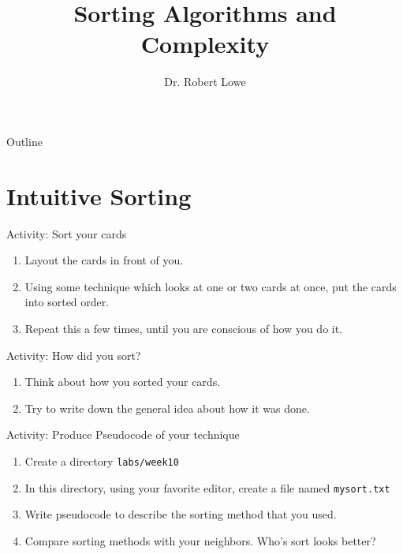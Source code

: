 \documentclass[]{beamer}
\title{Sorting Algorithms and Complexity}
\author{Dr. Robert Lowe\\}
\institute[Maryville College] %
{
  Division of Mathematics and Computer Science\\
  Maryville College
}
\date[]{}
\begin{document}
\begin{frame}
  \titlepage
\end{frame}

\begin{frame}{Outline}
  \tableofcontents
\end{frame}





\section{Intuitive Sorting}
\begin{frame}{Activity: Sort your cards}
\begin{enumerate}
    \item Layout the cards in front of you.
    \item Using some technique which looks at one or two cards at
        once, put the cards into sorted order.
    \item Repeat this a few times, until you are conscious of how you
        do it.
\end{enumerate}
\end{frame}

\begin{frame}{Activity: How did you sort?}
\begin{enumerate}
    \item Think about how you sorted your cards.
    \item Try to write down the general idea about how it was done.
\end{enumerate}
\end{frame}

\begin{frame}{Activity: Produce Pseudocode of your technique}
\begin{enumerate}
    \item Create a directory \texttt{labs/week10}
    \item In this directory, using your favorite editor, create a file
        named \texttt{mysort.txt}
    \item Write pseudocode to describe the sorting method that you
        used.
    \item Compare sorting methods with your neighbors.  Who's sort
        looks better?
\end{enumerate}
\end{frame}
\end{document}
